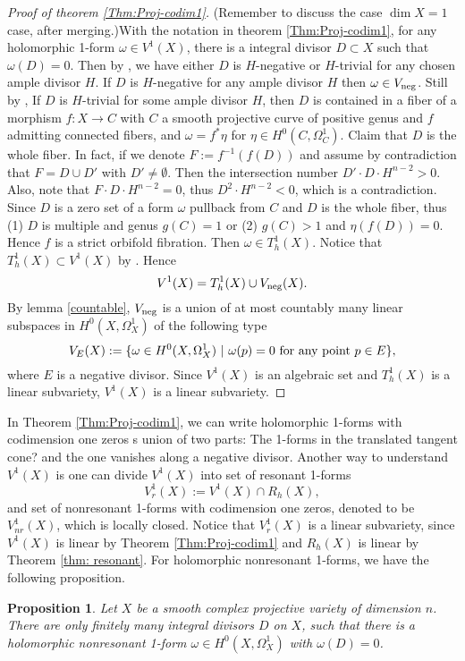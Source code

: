 \documentclass[a4paper,12pt,reqno]{amsart}
\theoremstyle{plain}
\newtheorem{proposition}[theorem]{Proposition}
\theoremstyle{remark}
\begin{document}
\begin{proof}[Proof  of theorem \ref{Thm:Proj-codim1}]
{\color{red}(Remember to discuss the case $\dim X=1$ case, after merging.)}With the notation in theorem \ref{Thm:Proj-codim1},  for any holomorphic 1-form $\omega\in V^1(X)$, there is a integral divisor $D\subset X$ such that $\omega(D)=0$. Then by \cite[theorem 2]{Sp88}, we have either $D$ is $H$-negative or $H$-trivial for any chosen ample divisor $H$. If $D$ is $H$-negative for any ample divisor $H$ then $\omega\in V_{\textnormal{neg}}$. Still by \cite[theorem 2]{Sp88}, If $D$ is $H$-trivial for some ample divisor $H$, then $D$ is contained in a fiber of a morphism $f: X\to C$ with $C$ a smooth projective curve of positive genus and $f$ admitting connected fibers, and $\omega=f^*\eta$ for $\eta\in H^0(C, \Omega_C^1)$. Claim that $D$ is the whole fiber. In fact, if we denote $F:=f^{-1}(f(D))$ and assume by contradiction that $F=D\cup D'$ with $D'\not=\emptyset$. Then the intersection number $D'\cdot D\cdot H^{n-2}>0$. Also, note that $F\cdot D\cdot H^{n-2}=0$, thus $D^2\cdot H^{n-2}<0$, which is a contradiction. Since $D$ is a zero set of a form $\omega$ pullback from $C$ and $D$ is the whole fiber, thus (1) $D$ is multiple and genus $g(C)=1$ or (2) $g(C)>1$ and $\eta(f(D))=0$. Hence $f$ is a strict orbifold fibration. Then $\omega\in T_h^1(X)$. Notice that $T_h^1(X)\subset V^1(X)$ by \cite{GL87}. Hence $$V^1(X)= T_h^1(X)\cup V_{\textnormal{neg}}(X).
$$
By lemma \ref{countable}, $V_{\textnormal{neg}}$ is a union of at most countably many linear subspaces in $H^0(X, \Omega_X^1)$ of the following type $$V_E(X):=\{\omega\in H^0(X, \Omega_X^1)\ |\ \omega(p)=0\  \textnormal{for any point}\ p\in E\},$$ where $E$ is a negative divisor. Since $V^1(X)$ is an algebraic set and $T_h^1(X)$ is a linear subvariety, $V^1(X)$ is a linear subvariety.
 \end{proof} 
 
 In Theorem \ref{Thm:Proj-codim1}, we can write holomorphic 1-forms with codimension one zeros s union of two parts: The 1-forms in the {\color{red} translated tangent cone?} and the one vanishes along a negative divisor.  Another way to understand  $V^1(X)$ is one can divide $V^1(X)$ into set of resonant 1-forms $$V^1_r(X):=V^1(X)\cap R_h(X),$$ and set of nonresonant 1-forms with codimension one zeros, denoted to be $V^1_{nr}(X)$, which is locally closed. Notice that $V_r^1(X)$ is a linear subvariety, since $V^1(X)$ is linear by Theorem \ref{Thm:Proj-codim1}  and $R_h(X)$ is linear by Theorem \ref{thm: resonant}. For holomorphic nonresonant 1-forms,  we have the following proposition.
 \begin{proposition}
Let $X$ be a smooth complex projective variety of dimension $n$. There are only finitely many integral divisors $D$ on $X$, such that there is a holomorphic nonresonant 1-form $\omega\in H^0(X, \Omega_X^1)$ with $\omega(D)=0$.
 \end{proposition}
 
\end{document}
